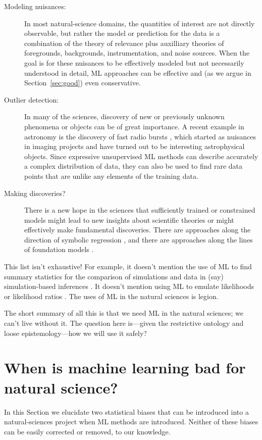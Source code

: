\documentclass[10pt]{article}
\newcommand{\sectionname}{Section}
\begin{document}
\begin{description}
  \item[Modeling nuisances:] In most natural-science domains, the quantities of interest are not directly observable, but rather the model or prediction for the data is a combination of the theory of relevance plus auxilliary theories of foregrounds, backgrounds, instrumentation, and noise sources.
  When the goal is for these nuisances to be effectively modeled but not necessarily understood in detail, ML approaches can be effective and (as we argue in \sectionname~\ref{sec:good}) even conservative.
  \item[Outlier detection:] In many of the sciences, discovery of new or previously unknown phenomena or objects can be of great importance.
  A recent example in astronomy is the discovery of fast radio bursts \cite{grbs}, which started as nuisances in imaging projects and have turned out to be interesting astrophysical objects.
  Since expressive unsupervised ML methods can describe accurately a complex distribution of data, they can also be used to find rare data points that are unlike any elements of the training data.
  \item[Making discoveries?] There is a new hope in the sciences that sufficiently trained or constrained models might lead to new insights about scientific theories or might effectively make fundamental discoveries.
  There are approaches along the direction of symbolic regression \cite{symbolic1, symbolic2}, and there are approaches along the lines of foundation models \cite{foundation1, foundation2}.
\end{description}
This list isn't exhaustive!
For example, it doesn't mention the use of ML to find summary statistics for the comparison of simulations and data in (say) simulation-based inferences \cite{sbi}.
It doesn't mention using ML to emulate likelihoods or likelihood ratios \cite{biwei, kyle}.
The uses of ML in the natural sciences is legion.

The short summary of all this is that we need ML in the natural sciences; we can't live without it.
The question here is---given the restrictive ontology and loose epistemology---how we will use it safely?

\section{When is machine learning bad for natural science?}\label{sec:bad}
In this \sectionname{} we elucidate two statistical biases that can be introduced into a natural-sciences project when ML methods are introduced.
Neither of these biases can be easily corrected or removed, to our knowledge.
\end{document}
